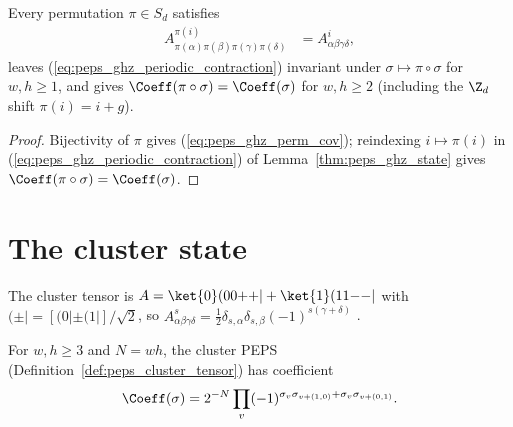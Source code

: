 \begin{lemma}
    \label{thm:peps_ghz_permutation}
    \leanok
    Every permutation $\pi\in S_d$ satisfies
    \begin{align}
        A^{\pi(i)}_{\pi(\alpha)\pi(\beta)\pi(\gamma)\pi(\delta)}
         & = A^i_{\alpha\beta\gamma\delta},
        \label{eq:peps_ghz_perm_cov}
    \end{align}
    leaves (\ref{eq:peps_ghz_periodic_contraction}) invariant under
    $\sigma\mapsto\pi\circ\sigma$ for $w,h\ge 1$, and gives
    $\Coeff(\pi\circ\sigma)=\Coeff(\sigma)$ for $w,h\ge 2$ (including the
    $\Z_d$ shift $\pi(i)=i+g$).
\end{lemma}

\begin{proof}\leanok
    Bijectivity of $\pi$ gives (\ref{eq:peps_ghz_perm_cov}); reindexing $i\mapsto\pi(i)$
    in (\ref{eq:peps_ghz_periodic_contraction}) of Lemma~\ref{thm:peps_ghz_state}
    gives $\Coeff(\pi\circ\sigma)=\Coeff(\sigma)$.
\end{proof}

\section{The cluster state}%
\label{sec:peps_cluster}

\begin{definition}%
    \label{def:peps_cluster_tensor}
    \leanok
    The cluster tensor is $A=\ket{0}(00{+}{+}|+\ket{1}(11{-}{-}|$ with
    $(\pm|=[(0|\pm(1|]/\sqrt{2}$, so
    $A^s_{\alpha\beta\gamma\delta}=\tfrac12\delta_{s,\alpha}\delta_{s,\beta}(-1)^{s(\gamma+\delta)}$
    \cite[Appendix~A, ``The cluster state'']{Cirac2021Matrix}.
\end{definition}

\begin{lemma}%
    \label{thm:peps_cluster_state}
    \leanok
    For $w,h\ge 3$ and $N=wh$, the cluster PEPS
    (Definition~\ref{def:peps_cluster_tensor}) has coefficient
    \begin{align}
        \Coeff(\sigma)=2^{-N}\prod_{v}(-1)^{\sigma_v\sigma_{v+(1,0)}
                +\sigma_v\sigma_{v+(0,1)}}.
        \label{eq:peps_cluster_coeff}
    \end{align}
\end{lemma}

